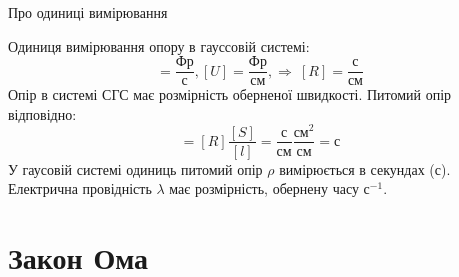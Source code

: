 \documentclass[onlytextwidth]{beamer}
\begin{document}
\begin{frame}{Про одиниці вимірювання}{}
	\begin{block}{}\justifying
		Одиниця вимірювання опору в гауссовій системі:
		\begin{equation*}
			[I] = \frac{\text{Фр}}{\text{с}}, [U] = \frac{\text{Фр}}{\text{см}}, \Rightarrow\ [R] =
			\frac{\text{с}}{\text{см}}
		\end{equation*}
		Опір в системі СГС має розмірність оберненої швидкості. Питомий опір відповідно:
		\begin{equation*}
			[\rho] = [R]\frac{[S]}{[l]} = \frac{\text{с}}{\text{см}} \frac{\text{см}^2}{\text{см}}
			= \text{с}
		\end{equation*}
		У гаусовій системі одиниць питомий опір $\rho$ вимірюється в секундах (с).
		Електрична провідність $\lambda$ має розмірність, обернену часу с${^{-1}}$.
	\end{block}
\end{frame}




\section{Закон Ома}
\end{document}
